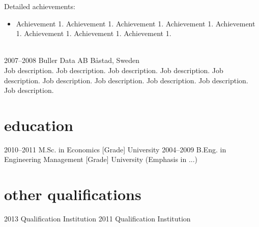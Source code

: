 \documentclass[]{cv-style}          %
\begin{document}
\begin{entrylist}
{  Detailed achievements:
  \begin{itemize}
    \item Achievement 1. Achievement 1. Achievement 1. Achievement 1. Achievement 1. Achievement 1. Achievement 1. Achievement 1. 
  \end{itemize}} \\
\entry
  {2007--2008}
  {Buller Data AB}
  {Båstad, Sweden}
  {\\
  Job description. Job description. Job description. Job description. Job description. Job description. Job description. Job description. Job description. Job description.\\}

\end{entrylist}


\section{education}

\begin{entrylist}
\entry
{2010--2011}
{M.Sc. {\normalfont in Economics [Grade]}}
{University}
{\vspace{-0.3cm}}
\entry
{2004--2009}
{B.Eng. {\normalfont in Engineering Management [Grade]}}
{University}
{(Emphasis in ...)}
\end{entrylist}


\section{other qualifications}

\begin{entrylist}
\entry
{2013}
{Qualification}
{Institution}
{\vspace{-0.3cm}}
\entry
{2011}
{Qualification}
{Institution}
{\vspace{-0.3cm}}
\end{entrylist}
\end{document}

